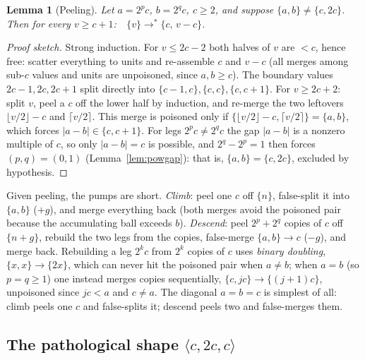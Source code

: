 \documentclass[11pt]{article}
\newtheorem{lemma}[theorem]{Lemma}
\theoremstyle{definition}
\theoremstyle{remark}
\newcommand{\lie}[3]{\langle #1,#2,#3\rangle}
\newcommand{\ms}[1]{\{#1\}}
\newcommand{\reach}{\longrightarrow^{*}}
\begin{document}
\begin{lemma}[Peeling]\label{lem:peel}
Let $a=2^pc$, $b=2^qc$, $c\ge 2$, and suppose $\{a,b\}\ne\{c,2c\}$.  Then
for every $v\ge c+1$:\ \ $\ms{v}\reach\ms{c,\,v-c}$.
\end{lemma}

\begin{proof}[Proof sketch]
Strong induction.  For $v\le 2c-2$ both halves of $v$ are $<c$, hence free:
scatter everything to units and re-assemble $c$ and $v-c$ (all merges among
sub-$c$ values and units are unpoisoned, since $a,b\ge c$).  The boundary
values $2c-1,2c,2c+1$ split directly into $\{c-1,c\},\{c,c\},\{c,c+1\}$.
For $v\ge 2c+2$: split $v$, peel a $c$ off the lower half by induction, and
re-merge the two leftovers $\lfloor v/2\rfloor-c$ and $\lceil v/2\rceil$.
This merge is poisoned only if
$\{\lfloor v/2\rfloor-c,\lceil v/2\rceil\}=\{a,b\}$, which forces
$|a-b|\in\{c,c+1\}$.  For legs $2^pc\ne 2^qc$ the gap $|a-b|$ is a nonzero
multiple of $c$, so only $|a-b|=c$ is possible, and $2^q-2^p=1$ then forces
$(p,q)=(0,1)$ (Lemma~\ref{lem:powgap}): that is, $\{a,b\}=\{c,2c\}$,
excluded by hypothesis.
\end{proof}

Given peeling, the pumps are short.  \emph{Climb}: peel one $c$ off
$\ms{n}$, false-split it into $\{a,b\}$ ($+g$), and merge everything back
(both merges avoid the poisoned pair because the accumulating ball exceeds
$b$).  \emph{Descend}: peel $2^p+2^q$ copies of $c$ off $\ms{n+g}$, rebuild
the two legs from the copies, false-merge $\{a,b\}\to c$ ($-g$), and merge
back.  Rebuilding a leg $2^kc$ from $2^k$ copies of $c$ uses \emph{binary
doubling}, $\ms{x,x}\to\ms{2x}$, which can never hit the poisoned pair when
$a\ne b$; when $a=b$ (so $p=q\ge 1$) one instead merges copies
sequentially, $\ms{c,jc}\to\ms{(j+1)c}$, unpoisoned since $jc<a$ and
$c\neq a$.  The diagonal $a=b=c$ is simplest of all: climb peels one $c$
and false-splits it; descend peels two and false-merges them.

\subsection{The pathological shape \texorpdfstring{$\lie{c}{2c}{c}$}{(c,2c,c)}}
\label{sec:peel4c}
\end{document}
